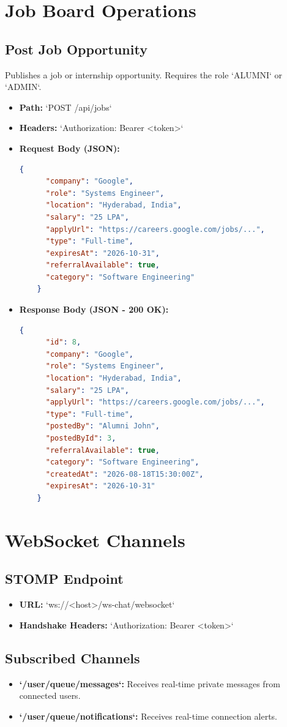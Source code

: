 \section{Job Board Operations}

\subsection{Post Job Opportunity}
Publishes a job or internship opportunity. Requires the role `ALUMNI` or `ADMIN`.
\begin{itemize}
    \item \textbf{Path:} `POST /api/jobs`
    \item \textbf{Headers:} `Authorization: Bearer <token>`
    \item \textbf{Request Body (JSON):}
    \begin{lstlisting}[language=json]
    {
      "company": "Google",
      "role": "Systems Engineer",
      "location": "Hyderabad, India",
      "salary": "25 LPA",
      "applyUrl": "https://careers.google.com/jobs/...",
      "type": "Full-time",
      "expiresAt": "2026-10-31",
      "referralAvailable": true,
      "category": "Software Engineering"
    }
    \end{lstlisting}
    \item \textbf{Response Body (JSON - 200 OK):}
    \begin{lstlisting}[language=json]
    {
      "id": 8,
      "company": "Google",
      "role": "Systems Engineer",
      "location": "Hyderabad, India",
      "salary": "25 LPA",
      "applyUrl": "https://careers.google.com/jobs/...",
      "type": "Full-time",
      "postedBy": "Alumni John",
      "postedById": 3,
      "referralAvailable": true,
      "category": "Software Engineering",
      "createdAt": "2026-08-18T15:30:00Z",
      "expiresAt": "2026-10-31"
    }
    \end{lstlisting}
\end{itemize}

\section{WebSocket Channels}

\subsection{STOMP Endpoint}
\begin{itemize}
    \item \textbf{URL:} `ws://<host>/ws-chat/websocket`
    \item \textbf{Handshake Headers:} `Authorization: Bearer <token>`
\end{itemize}

\subsection{Subscribed Channels}
\begin{itemize}
    \item \textbf{`/user/queue/messages`:} Receives real-time private messages from connected users.
    \item \textbf{`/user/queue/notifications`:} Receives real-time connection alerts.
\end{itemize}
